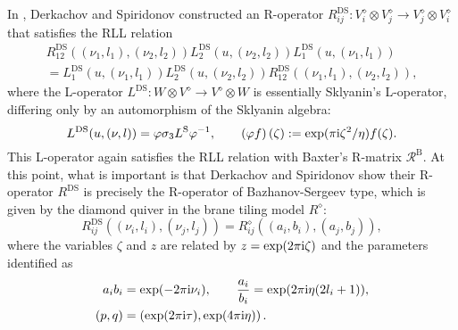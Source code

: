 In \cite{Derkachov:2012iv}, Derkachov and Spiridonov constructed
an R-operator $R_{ij}^{\mathrm{DS}}:V_{i}^{\diamond}\otimes V_{j}^{\diamond}\rightarrow V_{j}^{\diamond}\otimes V_{i}^{\diamond}$
that satisfies the RLL relation
\begin{multline}
    R_{12}^{\mathrm{DS}}((\nu_{1},l_{1}),(\nu_{2},l_{2}))
    L_{2}^{\mathrm{DS}}(u,(\nu_{2},l_{2}))
    L_{1}^{\mathrm{DS}}(u,(\nu_{1},l_{1}))    \\
      =
        L_{1}^{\mathrm{DS}}(u,(\nu_{1},l_{1}))
        L_{2}^{\mathrm{DS}}(u,(\nu_{2},l_{2}))
        R_{12}^{\mathrm{DS}}((\nu_{1},l_{1}),(\nu_{2},l_{2})),
\end{multline}
where the L-operator $L^{\mathrm{DS}}:W\otimes V^{\diamond}\to V^{\diamond}\otimes W$
is essentially Sklyanin's L-operator, differing only by an automorphism
of the Sklyanin algebra:
\begin{equation}
    L^{\mathrm{DS}}(u,(\nu,l))
      =  \varphi  \sigma_{3}  L^{\mathrm{S}}\varphi^{-1},
        \qquad  \left(\varphi f\right)(\zeta)  :=  \exp(\pi \mathrm{i} \zeta^{2}/\eta)f(\zeta).
\end{equation}
This L-operator again satisfies the RLL relation with Baxter's R-matrix
$\mathcal{R}^{\mathrm{B}}$. At this point, what is important is that
Derkachov and Spiridonov show their R-operator $R^{\mathrm{DS}}$ is precisely the R-operator
of Bazhanov-Sergeev type, which is given by
the diamond quiver in the brane tiling model $R^{\diamond}$:
\begin{equation}
    R_{ij}^{\mathrm{DS}}((\nu_{i},l_{i}),(\nu_{j},l_{j}))
      =
        R_{ij}^{\diamond}((a_{i},b_{i}),(a_{j},b_{j})),
\end{equation}
where the variables $\zeta$ and $z$ are related by $z=\exp(2\pi \mathrm{i} \zeta)$
and the parameters identified as
\begin{align}
  a_{i} b_{i} &  =  \exp(-2\pi \mathrm{i} \nu_{i}),  \qquad  \frac{a_{i}}{b_{i}}  =  \exp(2\pi \mathrm{i}\eta(2l_{i}+1)),  \\
  (p,q)       &  =  \left(\exp(2\pi \mathrm{i}\tau),\exp(4\pi \mathrm{i}\eta)\right).
\end{align}

